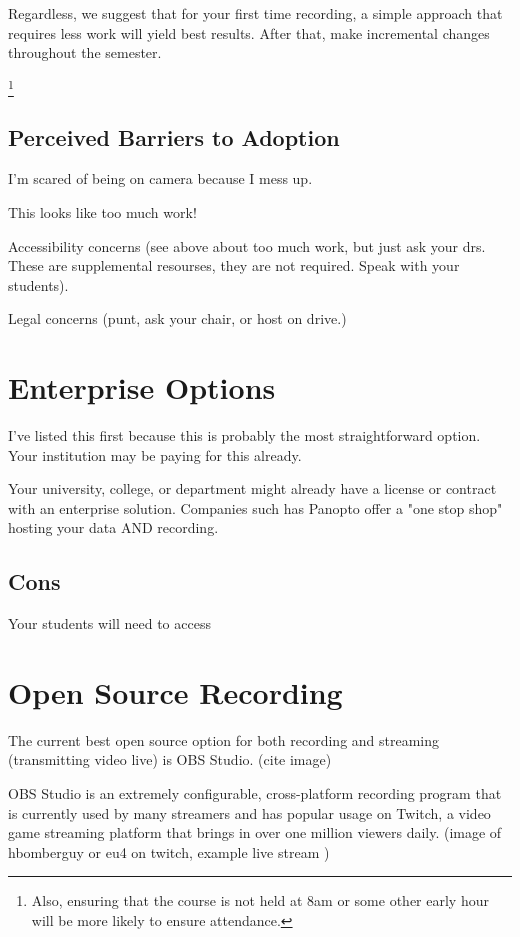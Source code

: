 \documentclass[sigconf]{acmart}
\begin{document}
Regardless, we suggest that for your first time recording, a simple approach that requires less work will yield best results.  
After that, make incremental changes throughout the semester.

\footnote{Also, ensuring that the course is not held at 8am or some other early hour will be more likely to ensure attendance.}

\subsection{Perceived Barriers to Adoption}
I'm scared of being on camera because I mess up.

This looks like too much work!

Accessibility concerns (see above about too much work, but just ask your drs.  These are supplemental resourses, they are not required.  Speak with your students).

Legal concerns (punt, ask your chair, or host on drive.)

\section{Enterprise Options}
I've listed this first because this is probably the most straightforward option.
Your institution may be paying for this already.

Your university, college, or department might already have a license or contract with an enterprise solution.
Companies such has Panopto  offer a "one stop shop" hosting your data AND recording.


\subsection{Cons}
Your students will need to access

\section{Open Source Recording}
The current best open source option for both recording and streaming (transmitting video live) is OBS Studio. (cite image)

OBS Studio is an extremely configurable, cross-platform recording program that is currently used by many streamers and has popular usage on Twitch, a video game streaming platform that brings in over one million viewers daily.  (image of hbomberguy or eu4 on twitch, example live stream )
\end{document}
